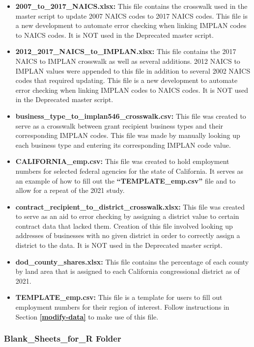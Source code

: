 \documentclass[
]{book}
\providecommand{\tightlist}{%
  \setlength{\itemsep}{0pt}\setlength{\parskip}{0pt}}
\begin{document}
\begin{itemize}
\tightlist
\item
  \textbf{2007\_to\_2017\_NAICS.xlsx:} This file contains the crosswalk used in the master script to update 2007 NAICS codes to 2017 NAICS codes. This file is a new development to automate error checking when linking IMPLAN codes to NAICS codes. It is NOT used in the Deprecated master script.
\item
  \textbf{2012\_2017\_NAICS\_to\_IMPLAN.xlsx:} This file contains the 2017 NAICS to IMPLAN crosswalk as well as several additions. 2012 NAICS to IMPLAN values were appended to this file in addition to several 2002 NAICS codes that required updating. This file is a new development to automate error checking when linking IMPLAN codes to NAICS codes. It is NOT used in the Deprecated master script.
\item
  \textbf{business\_type\_to\_implan546\_crosswalk.csv:} This file was created to serve as a crosswalk between grant recipient business types and their corresponding IMPLAN codes. This file was made by manually looking up each business type and entering its corresponding IMPLAN code value.
\item
  \textbf{CALIFORNIA\_emp.csv:} This file was created to hold employment numbers for selected federal agencies for the state of California. It serves as an example of how to fill out the \textbf{``TEMPLATE\_emp.csv''} file and to allow for a repeat of the 2021 study.\\
\item
  \textbf{contract\_recipient\_to\_district\_crosswalk.xlsx:} This file was created to serve as an aid to error checking by assigning a district value to certain contract data that lacked them. Creation of this file involved looking up addresses of businesses with no given district in order to correctly assign a district to the data. It is NOT used in the Deprecated master script.\\
\item
  \textbf{dod\_county\_shares.xlsx:} This file contains the percentage of each county by land area that is assigned to each California congressional district as of 2021.
\item
  \textbf{TEMPLATE\_emp.csv:} This file is a template for users to fill out employment numbers for their region of interest. Follow instructions in Section \textbf{\ref{modify-data}} to make use of this file.
\end{itemize}

\hypertarget{sheets}{%
\subsubsection{Blank\_Sheets\_for\_R Folder}\label{sheets}}
\end{document}
